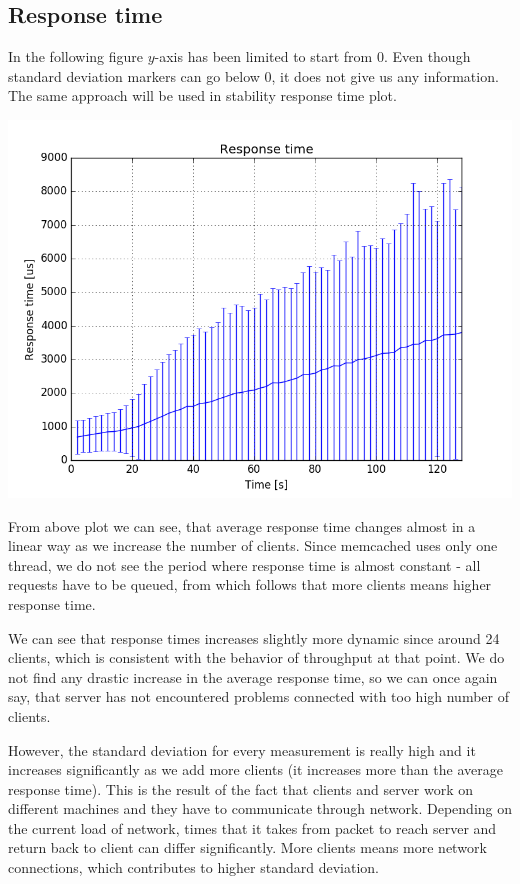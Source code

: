 \documentclass[11pt]{article}
\begin{document}
\subsection{Response time}\label{sec:baseline:rt}

In the following figure $y$-axis has been limited to start from 0. Even though standard deviation markers can go below 0, it does not give us any information. The same approach will be used in stability response time plot.

\includegraphics[scale=0.7]{baseline_response_time.png}
\medskip

From above plot we can see, that average response time changes almost in a linear way as we increase the number of clients. Since memcached uses only one thread, we do not see the period where response time is almost constant - all requests have to be queued, from which follows that more clients means higher response time.

We can see that response times increases slightly more dynamic since around 24 clients, which is consistent with the behavior of throughput at that point. We do not find any drastic increase in the average response time, so we can once again say, that server has not encountered problems connected with too high number of clients.

However, the standard deviation for every measurement is really high and it increases significantly as we add more clients (it increases more than the average response time). This is the result of the fact that clients and server work on different machines and they have to communicate through network. Depending on the current load of network, times that it takes from packet to reach server and return back to client can differ significantly. More clients means more network connections, which contributes to higher standard deviation.
\end{document}
